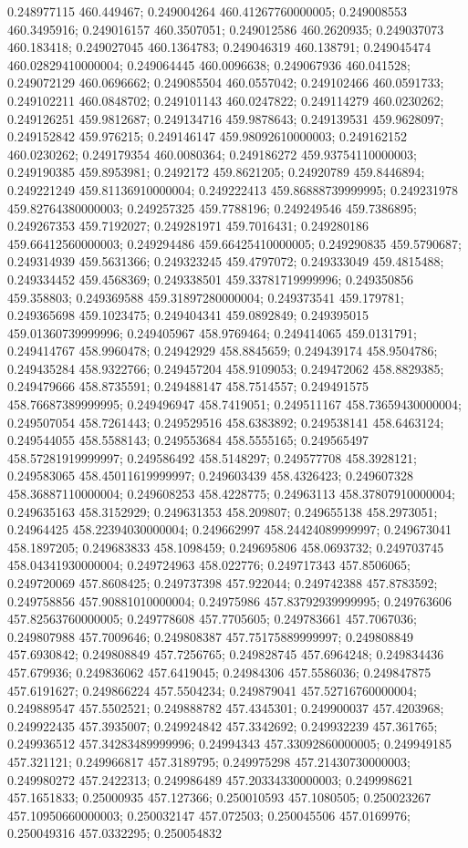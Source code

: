 0.248977115 460.449467; 0.249004264 460.41267760000005; 0.249008553 460.3495916; 0.249016157 460.3507051; 0.249012586 460.2620935; 0.249037073 460.183418; 0.249027045 460.1364783; 0.249046319 460.138791; 0.249045474 460.02829410000004; 0.249064445 460.0096638; 0.249067936 460.041528; 0.249072129 460.0696662; 0.249085504 460.0557042; 0.249102466 460.0591733; 0.249102211 460.0848702; 0.249101143 460.0247822; 0.249114279 460.0230262; 0.249126251 459.9812687; 0.249134716 459.9878643; 0.249139531 459.9628097; 0.249152842 459.976215; 0.249146147 459.98092610000003; 0.249162152 460.0230262; 0.249179354 460.0080364; 0.249186272 459.93754110000003; 0.249190385 459.8953981; 0.2492172 459.8621205; 0.24920789 459.8446894; 0.249221249 459.81136910000004; 0.249222413 459.86888739999995; 0.249231978 459.82764380000003; 0.249257325 459.7788196; 0.249249546 459.7386895; 0.249267353 459.7192027; 0.249281971 459.7016431; 0.249280186 459.66412560000003; 0.249294486 459.66425410000005; 0.249290835 459.5790687; 0.249314939 459.5631366; 0.249323245 459.4797072; 0.249333049 459.4815488; 0.249334452 459.4568369; 0.249338501 459.33781719999996; 0.249350856 459.358803; 0.249369588 459.31897280000004; 0.249373541 459.179781; 0.249365698 459.1023475; 0.249404341 459.0892849; 0.249395015 459.01360739999996; 0.249405967 458.9769464; 0.249414065 459.0131791; 0.249414767 458.9960478; 0.24942929 458.8845659; 0.249439174 458.9504786; 0.249435284 458.9322766; 0.249457204 458.9109053; 0.249472062 458.8829385; 0.249479666 458.8735591; 0.249488147 458.7514557; 0.249491575 458.76687389999995; 0.249496947 458.7419051; 0.249511167 458.73659430000004; 0.249507054 458.7261443; 0.249529516 458.6383892; 0.249538141 458.6463124; 0.249544055 458.5588143; 0.249553684 458.5555165; 0.249565497 458.57281919999997; 0.249586492 458.5148297; 0.249577708 458.3928121; 0.249583065 458.45011619999997; 0.249603439 458.4326423; 0.249607328 458.36887110000004; 0.249608253 458.4228775; 0.24963113 458.37807910000004; 0.249635163 458.3152929; 0.249631353 458.209807; 0.249655138 458.2973051; 0.24964425 458.22394030000004; 0.249662997 458.24424089999997; 0.249673041 458.1897205; 0.249683833 458.1098459; 0.249695806 458.0693732; 0.249703745 458.04341930000004; 0.249724963 458.022776; 0.249717343 457.8506065; 0.249720069 457.8608425; 0.249737398 457.922044; 0.249742388 457.8783592; 0.249758856 457.90881010000004; 0.24975986 457.83792939999995; 0.249763606 457.82563760000005; 0.249778608 457.7705605; 0.249783661 457.7067036; 0.249807988 457.7009646; 0.249808387 457.75175889999997; 0.249808849 457.6930842; 0.249808849 457.7256765; 0.249828745 457.6964248; 0.249834436 457.679936; 0.249836062 457.6419045; 0.24984306 457.5586036; 0.249847875 457.6191627; 0.249866224 457.5504234; 0.249879041 457.52716760000004; 0.249889547 457.5502521; 0.249888782 457.4345301; 0.249900037 457.4203968; 0.249922435 457.3935007; 0.249924842 457.3342692; 0.249932239 457.361765; 0.249936512 457.34283489999996; 0.24994343 457.33092860000005; 0.249949185 457.321121; 0.249966817 457.3189795; 0.249975298 457.21430730000003; 0.249980272 457.2422313; 0.249986489 457.20334330000003; 0.249998621 457.1651833; 0.25000935 457.127366; 0.250010593 457.1080505; 0.250023267 457.10950660000003; 0.250032147 457.072503; 0.250045506 457.0169976; 0.250049316 457.0332295; 0.250054832 